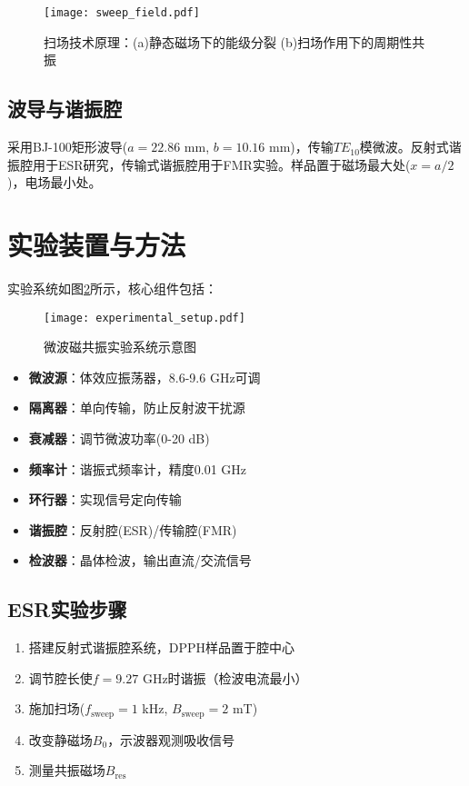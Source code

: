 \documentclass{thuemp}
\begin{document}
\begin{figure}[H]
    \centering
    \texttt{[image: sweep\_field.pdf]}
    \caption{扫场技术原理：(a)静态磁场下的能级分裂 (b)扫场作用下的周期性共振}
    \label{fig:sweep_field}
\end{figure}

\subsection{波导与谐振腔}
采用BJ-100矩形波导($a=22.86$ mm, $b=10.16$ mm)，传输$TE_{10}$模微波。反射式谐振腔用于ESR研究，传输式谐振腔用于FMR实验。样品置于磁场最大处($x=a/2$)，电场最小处。

\section{实验装置与方法}
实验系统如图\ref{fig:experimental_setup}所示，核心组件包括：

\begin{figure}[H]
    \centering
    \texttt{[image: experimental\_setup.pdf]}
    \caption{微波磁共振实验系统示意图}
    \label{fig:experimental_setup}
\end{figure}

\begin{itemize}
    \item \textbf{微波源}：体效应振荡器，8.6-9.6 GHz可调
    \item \textbf{隔离器}：单向传输，防止反射波干扰源
    \item \textbf{衰减器}：调节微波功率(0-20 dB)
    \item \textbf{频率计}：谐振式频率计，精度0.01 GHz
    \item \textbf{环行器}：实现信号定向传输
    \item \textbf{谐振腔}：反射腔(ESR)/传输腔(FMR)
    \item \textbf{检波器}：晶体检波，输出直流/交流信号
\end{itemize}

\subsection{ESR实验步骤}
\begin{enumerate}
    \item 搭建反射式谐振腔系统，DPPH样品置于腔中心
    \item 调节腔长使$f=9.27$ GHz时谐振（检波电流最小）
    \item 施加扫场($f_{\mathrm{sweep}}=1$ kHz, $B_{\mathrm{sweep}}=2$ mT)
    \item 改变静磁场$B_0$，示波器观测吸收信号
    \item 测量共振磁场$B_{\mathrm{res}}$
\end{enumerate}
\end{document}
